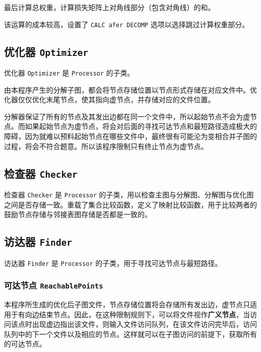 \documentclass[a4paper,12pt]{article}
\begin{document}
\begin{CJK}{UTF8}{song}
最后计算总权重，计算损失矩阵上对角线部分（包含对角线）的和。

该运算的成本较高，设置了 \texttt{CALC\ afer\ DECOMP}
选项以选择跳过计算权重部分。

\hypertarget{header-n199}{%
\subsection{\texorpdfstring{优化器
\texttt{Optimizer}}{优化器 Optimizer}}\label{header-n199}}

优化器 \texttt{Optimizer} 是 \texttt{Processor} 的子类。

由本程序产生的分解子图，都会将节点存储位置以节点形式存储在对应文件中。优化器仅仅优化末尾节点，使其指向虚节点，并存储对应的文件位置。

分解器保证了所有的节点及其发出边都在同一个文件中，所以起始节点不会为虚节点。而如果起始节点为虚节点，将会对后面的寻找可达节点和最短路径造成极大的障碍，因为就难以预料起始节点在哪些文件中，最终很有可能沦为变相合并子图的过程，将会不符合题意。所以该程序限制只有终止节点为虚节点。

\hypertarget{header-n203}{%
\subsection{\texorpdfstring{检查器
\texttt{Checker}}{检查器 Checker}}\label{header-n203}}

检查器 \texttt{Checker} 是 \texttt{Processor}
的子类，用以检查主图与分解图、分解图与优化图之间是否存储一致。重载了集合比较函数，定义了映射比较函数，用于比较两者的鼓励节点存储与邻接表图存储是否都是一致的。

\hypertarget{header-n206}{%
\subsection{\texorpdfstring{访达器
\texttt{Finder}}{访达器 Finder}}\label{header-n206}}

访达器 \texttt{Finder} 是 \texttt{Processor}
的子类，用于寻找可达节点与最短路径。

\hypertarget{header-n208}{%
\subsubsection{\texorpdfstring{可达节点
\texttt{ReachablePoints}}{可达节点 ReachablePoints}}\label{header-n208}}

本程序所生成的优化后子图文件，节点存储位置将会存储所有发出边，虚节点只适用于有向边结束节点。因此，在这种限制规则下，可以将文件视作\textbf{广义节点}，当访问该点时出现虚边指出该文件，则输入文件访问队列，在该文件访问完毕后，访问队列中的下一个文件以及相应的节点。这样就可以在子图访问的前提下，获取所有的可达节点。


\end{CJK}
\end{document}
